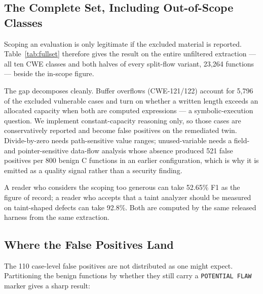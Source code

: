 \documentclass[10pt,conference]{IEEEtran}
\begin{document}
\subsection{The Complete Set, Including Out-of-Scope Classes}
\label{sec:outofscope}
Scoping an evaluation is only legitimate if the excluded material is
reported. Table~\ref{tab:fullset} therefore gives the result on the entire
unfiltered extraction --- all ten CWE classes and both halves of every
split-flow variant, 23{,}264 functions --- beside the in-scope figure.

\begin{table}[t]
\centering
\caption{Case-level results by evaluation scope. The difference is not
tuning: it is the four weakness classes whose defining question the analysis
cannot answer, plus the split-flow variants whose evidence lies outside the
translation unit.}
\label{tab:fullset}
\end{table}

The gap decomposes cleanly. Buffer overflows (CWE-121/122) account for
5{,}796 of the excluded vulnerable cases and turn on whether a written length
exceeds an allocated capacity when both are computed expressions --- a
symbolic-execution question. We implement constant-capacity reasoning only,
so those cases are conservatively reported and become false positives on the
remediated twin. Divide-by-zero needs path-sensitive value ranges;
unused-variable needs a field- and pointer-sensitive data-flow analysis whose
absence produced 521 false positives per 800 benign C functions in an earlier
configuration, which is why it is emitted as a quality signal rather than a
security finding.

A reader who considers the scoping too generous can take 52.65\% F1 as the
figure of record; a reader who accepts that a taint analyzer should be
measured on taint-shaped defects can take 92.8\%. Both are computed by the
same released harness from the same extraction.

\subsection{Where the False Positives Land}
\label{sec:label}
The 110 case-level false positives are not distributed as one might expect.
Partitioning the benign functions by whether they still carry a
\texttt{POTENTIAL FLAW} marker gives a sharp result:
\end{document}
